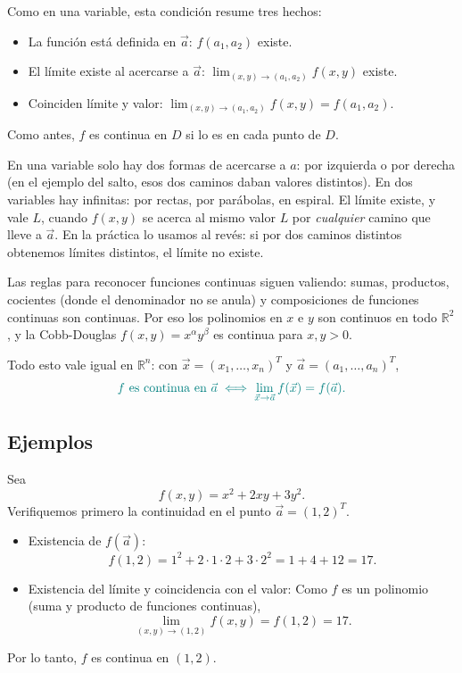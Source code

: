 \documentclass{article}
\newcommand{\vect}[1]{\vec{#1}}
\begin{document}
Como en una variable, esta condición resume tres hechos:
\begin{itemize}
  \item {\color{teal}La función está definida en \(\vect{a}\):} \(f(a_1,a_2)\) existe.
  \item {\color{teal}El límite existe al acercarse a \(\vect{a}\):}
  \(\displaystyle \lim_{(x,y)\to(a_1,a_2)} f(x,y)\) existe.
  \item {\color{teal}Coinciden límite y valor:}
  \(\displaystyle \lim_{(x,y)\to(a_1,a_2)} f(x,y)=f(a_1,a_2)\).
\end{itemize}
Como antes, \(f\) es {\color{teal}continua en \(D\)} si lo es en cada punto de \(D\).

En una variable solo hay dos formas de acercarse a \(a\): por izquierda o por derecha (en el ejemplo del salto, esos dos caminos daban valores distintos). En dos variables hay infinitas: por rectas, por parábolas, en espiral. El límite existe, y vale \(L\), cuando \(f(x,y)\) se acerca al mismo valor \(L\) por \emph{cualquier} camino que lleve a \(\vect{a}\). En la práctica lo usamos al revés: {\color{teal}si por dos caminos distintos obtenemos límites distintos, el límite no existe.}

Las reglas para reconocer funciones continuas siguen valiendo: sumas, productos, cocientes (donde el denominador no se anula) y composiciones de funciones continuas son continuas. Por eso los polinomios en \(x\) e \(y\) son continuos en todo \(\mathbb{R}^{2}\), y la Cobb-Douglas \(f(x,y)=x^{\alpha}y^{\beta}\) es continua para \(x,y>0\).

Todo esto vale igual en \(\mathbb{R}^{n}\): con \(\vect{x}=(x_1,\dots,x_n)^T\) y \(\vect{a}=(a_1,\dots,a_n)^T\),
\[
  \color{teal}
  f \text{ es continua en } \vect{a}
  \;\Longleftrightarrow\;
  \lim_{\vect{x}\to\vect{a}} f(\vect{x})=f(\vect{a}).
\]


\subsection*{Ejemplos}

Sea
\[
f(x,y)=x^{2}+2xy+3y^{2}.
\]
Verifiquemos primero la continuidad en el punto \(\vect{a}=(1,2)^T\).

\begin{itemize}
  \item {\color{teal}Existencia de \(f(\vect{a})\):}
  \[
  f(1,2)=1^{2}+2\cdot1\cdot2+3\cdot2^{2}=1+4+12=17.
  \]
  \item {\color{teal}Existencia del límite y coincidencia con el valor:}
  Como \(f\) es un polinomio (suma y producto de funciones continuas),
  \[
  \lim_{(x,y)\to(1,2)}f(x,y)
  = f(1,2)=17.
  \]
\end{itemize}
Por lo tanto, {\color{teal}\(f\) es continua en \((1,2)\)}.
\end{document}
